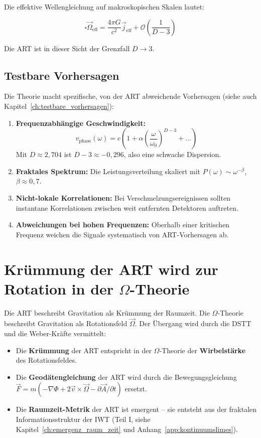 Die effektive Wellengleichung auf makroskopischen Skalen lautet:

\[
\square \vec{\Omega}_{\text{eff}} = \frac{4\pi G}{c^2} \vec{j}_{\text{eff}} + \mathcal{O}\left(\frac{1}{D-3}\right)
\]

Die ART ist in dieser Sicht der Grenzfall \( D \to 3 \).

\subsection{Testbare Vorhersagen}
\label{sub:omega_vorhersagen}

Die Theorie macht spezifische, von der ART abweichende Vorhersagen (siehe auch Kapitel~\ref{ch:testbare_vorhersagen}):

\begin{enumerate}
    \item \textbf{Frequenzabhängige Geschwindigkeit:}
    \[
    v_{\text{phase}}(\omega) = c \left( 1 + \alpha \left( \frac{\omega}{\omega_0} \right)^{D-3} + \dots \right)
    \]
    Mit \( D \approx 2,704 \) ist \( D-3 \approx -0,296 \), also eine schwache Dispersion.

    \item \textbf{Fraktales Spektrum:} Die Leistungsverteilung skaliert mit \( P(\omega) \sim \omega^{-\beta} \), \( \beta \approx 0,7 \).

    \item \textbf{Nicht-lokale Korrelationen:} Bei Verschmelzungsereignissen sollten instantane Korrelationen zwischen weit entfernten Detektoren auftreten.

    \item \textbf{Abweichungen bei hohen Frequenzen:} Oberhalb einer kritischen Frequenz weichen die Signale systematisch von ART-Vorhersagen ab.
\end{enumerate}

\section{Krümmung der ART wird zur Rotation in der \( \Omega \)-Theorie}
\label{sec:kruemmung_zu_rotation}

Die ART beschreibt Gravitation als Krümmung der Raumzeit. Die \( \Omega \)-Theorie beschreibt Gravitation als Rotationsfeld \( \vec{\Omega} \). Der Übergang wird durch die DSTT und die Weber-Kräfte vermittelt:

\begin{itemize}
    \item Die \textbf{Krümmung} der ART entspricht in der \( \Omega \)-Theorie der \textbf{Wirbelstärke} des Rotationsfeldes.
    \item Die \textbf{Geodätengleichung} der ART wird durch die Bewegungsgleichung \( \vec{F} = m(-\nabla \Phi + 2\vec{v} \times \vec{\Omega} - \partial\vec{A}/\partial t) \) ersetzt.
    \item Die \textbf{Raumzeit-Metrik} der ART ist emergent – sie entsteht aus der fraktalen Informationsstruktur der IWT (Teil I, siehe Kapitel~\ref{ch:emergenz_raum_zeit} und Anhang~\ref{app:kontinuumslimes}).
\end{itemize}

